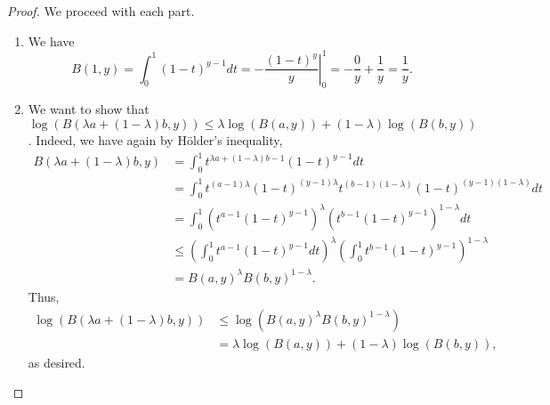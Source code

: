 \documentclass[12pt]{article}
\theoremstyle{remark}
\theoremstyle{named}
\renewcommand{\l}{\lambda}
\begin{document}
\begin{proof}
    We proceed with each part.
    \begin{enumerate}
        \item We have \[B(1, y) = \int_{0}^{1} (1 - t)^{y - 1} dt = \left . -\frac{(1 - t)^y}{y}\right |_0^1 = - \frac{0}{y} + \frac{1}{y} = \frac{1}{y}.\]
        
        \item We want to show that \(\log(B(\l a + (1 - \l)b, y)) \leq \l \log(B(a, y)) + (1 - \l)\log(B(b, y))\). Indeed, we have again by H\"older's inequality,
        \begin{align*}
            B(\l a + (1 - \l)b, y) &= \int_{0}^{1} t^{\l a + (1 - \l) b - 1}(1 - t)^{y - 1} dt \\
            &= \int_{0}^{1} t^{(a - 1)\l} (1 - t)^{(y - 1)\l}t^{(b - 1)(1 - \l)} (1 - t)^{(y - 1)(1 - \l)} dt \\
            &= \int_{0}^{1} (t^{a - 1} (1 - t)^{y - 1})^\l(t^{b - 1} (1 - t)^{y - 1})^{1 - \l} dt \\
            &\leq \left(\int_{0}^{1} t^{a - 1} (1 - t)^{y - 1} dt\right)^\l \left(\int_{0}^{1} t^{b - 1} (1 - t)^{y - 1}\right)^{1 - \l} \\
            &= B(a, y)^\l B(b, y)^{1 - \l}.
        \end{align*}
        Thus, 
        \begin{align*}
            \log (B(\l a + (1 - \l)b, y)) &\leq \log(B(a, y)^\l B(b, y)^{1 - \l}) \\
            &= \l \log(B(a, y)) + (1 - \l)\log(B(b, y)),
        \end{align*}
        as desired.


\end{enumerate}
\end{proof}
\end{document}
